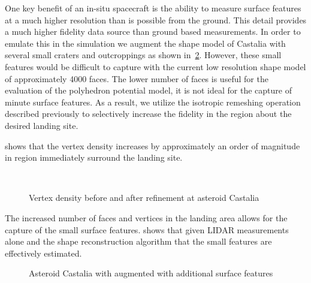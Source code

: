 \documentclass[smallextended]{svjour3}       %
\begin{document}
One key benefit of an in-situ spacecraft is the ability to measure surface features at a much higher resolution than is possible from the ground. 
This detail provides a much higher fidelity data source than ground based measurements. 
In order to emulate this in the simulation we augment the shape model of Castalia with several small craters and outcroppings as shown in~\cref{fig:castalia_refinement}.
However, these small features would be difficult to capture with the current low resolution shape model of approximately \num{4000} faces.
The lower number of faces is useful for the evaluation of the polyhedron potential model, it is not ideal for the capture of minute surface features. 
As a result, we utilize the isotropic remeshing operation described previously to selectively increase the fidelity in the region about the desired landing site.

 shows that the vertex density increases by approximately an order of magnitude in region immediately surround the landing site.
\begin{figure}[htbp]
    \centering
    \\
    \caption{Vertex density before and after refinement at asteroid Castalia\label{fig:castalia_refine_density}}
\end{figure}

The increased number of faces and vertices in the landing area allows for the capture of the small surface features.
 shows that given LIDAR measurements alone and the shape reconstruction algorithm that the small features are effectively estimated.
\begin{figure}[htbp]
    \centering
    \caption{Asteroid Castalia with augmented with additional surface features~\label{fig:castalia_refinement}}
\end{figure}
\end{document}
